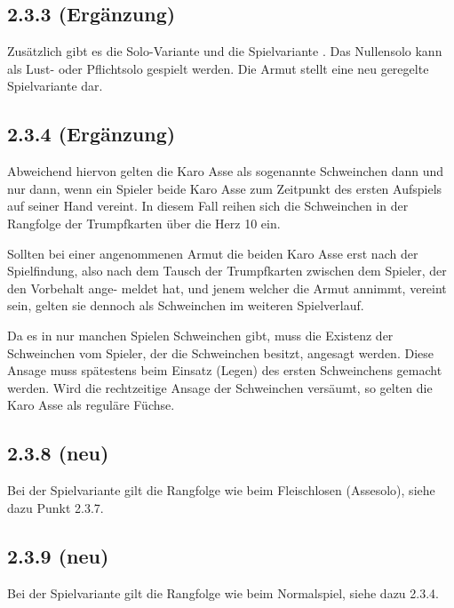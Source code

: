 \subsection*{2.3.3 (Ergänzung)}

Zusätzlich gibt es die Solo-Variante  und die
Spielvariante . Das Nullensolo kann als Lust- oder Pflichtsolo
gespielt werden. Die Armut stellt eine neu geregelte Spielvariante dar.

\subsection*{2.3.4 (Ergänzung)}

Abweichend hiervon gelten die Karo Asse als sogenannte Schweinchen dann
und nur dann, wenn ein Spieler beide Karo Asse zum Zeitpunkt des ersten
Aufspiels auf seiner Hand vereint. In diesem Fall reihen sich die
Schweinchen in der Rangfolge der Trumpfkarten über die Herz 10 ein.

Sollten bei einer angenommenen Armut die beiden Karo Asse erst nach der
Spielfindung, also nach dem Tausch der Trumpfkarten zwischen dem
Spieler, der den Vorbehalt ange- meldet hat, und jenem welcher die Armut
annimmt, vereint sein, gelten sie dennoch als Schweinchen im weiteren
Spielverlauf.

Da es in nur manchen Spielen Schweinchen gibt, muss die Existenz der
Schweinchen vom Spieler, der die Schweinchen besitzt, angesagt werden.
Diese Ansage muss spätestens beim Einsatz (Legen) des ersten
Schweinchens gemacht werden. Wird die rechtzeitige Ansage der
Schweinchen versäumt, so gelten die Karo Asse als reguläre Füchse.

\subsection*{2.3.8 (neu)}

Bei der Spielvariante  gilt die Rangfolge wie beim
Fleischlosen (Assesolo), siehe dazu Punkt 2.3.7.

\subsection*{2.3.9 (neu)}

Bei der Spielvariante  gilt die Rangfolge wie beim Normalspiel,
siehe dazu 2.3.4.

